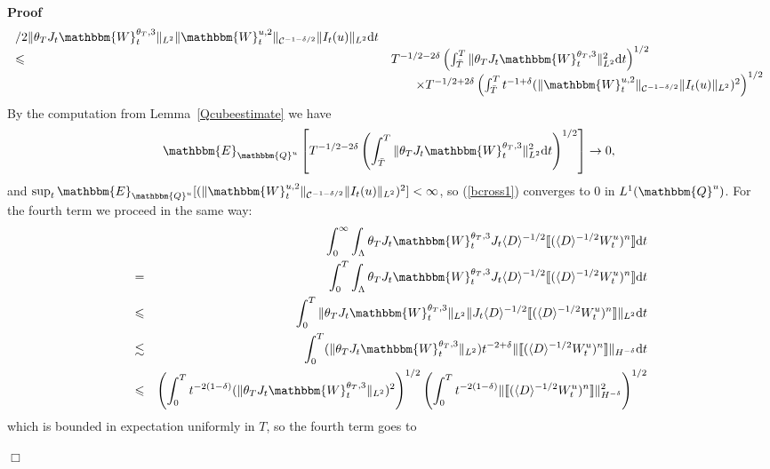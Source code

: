 \documentclass[11pt]{article}
\newcommand{\mathd}{\mathrm{d}}
\newenvironment{proof}{\noindent\textbf{Proof\ }}{\hspace*{\fill}$\Box$\medskip}
\begin{document}
\begin{proof}
\begin{equation}
\begin{array}{ll}
{      / 2} \| \theta_T J_t \mathbbm{W}_t^{\theta_T, 3} \|_{L^2}  \|
      \mathbbm{W}_t^{u, 2} \|_{\mathcal{C}^{- 1 - \delta / 2}} \| I_t (u)
      \|_{L^2} \mathd t\\
      \leqslant & T^{- 1 / 2 - 2 \delta} \left( \int^T_{\bar{T}} \| \theta_T
      J_t \mathbbm{W}_t^{\theta_T, 3} \|^2_{L^2} \mathd t \right)^{1 / 2}\\
      & \qquad \times T^{- 1 / 2 + 2 \delta} \left( \int^T_{\bar{T}} t^{- 1 +
      \delta} (\| \mathbbm{W}_t^{u, 2} \|_{\mathcal{C}^{- 1 - \delta / 2}} \|
      I_t (u) \|_{L^2})^2 \right)^{1 / 2}
    \end{array} \label{bcross1}
  \end{equation}
  By the computation from Lemma~\ref{Qcubeestimate} we have
  \[ \mathbbm{E}_{\mathbbm{Q}^u} \left[ T^{- 1 / 2 - 2 \delta} \left(
     \int^T_{\bar{T}} \| \theta_T J_t \mathbbm{W}_t^{\theta_T, 3} \|^2_{L^2}
     \mathd t \right)^{1 / 2} \right] \rightarrow 0, \]
  and $\sup_t \mathbbm{E}_{\mathbbm{Q}^u} [(\| \mathbbm{W}_t^{u, 2}
  \|_{\mathcal{C}^{- 1 - \delta / 2}} \| I_t (u) \|_{L^2})^2] < \infty$, so
  (\ref{bcross1}) converges to $0$ in $L^1 (\mathbbm{Q}^u)$. For the fourth
  term we proceed in the same way:
  \begin{eqnarray*}
    &  & \int^{\infty}_0 \int_{\Lambda} \theta_T J_t \mathbbm{W}_t^{\theta_T,
    3} J_t \langle D \rangle^{- 1 / 2} \llbracket (\langle D \rangle^{- 1 / 2}
    W^u_t)^n \rrbracket \mathd t\\
    & = & \int^T_0 \int_{\Lambda} \theta_T J_t \mathbbm{W}_t^{\theta_T, 3}
    J_t \langle D \rangle^{- 1 / 2} \llbracket (\langle D \rangle^{- 1 / 2}
    W^u_t)^n \rrbracket \mathd t\\
    & \leqslant & \int^T_0 \| \theta_T J_t \mathbbm{W}_t^{\theta_T, 3}
    \|_{L^2} \| J_t \langle D \rangle^{- 1 / 2} \llbracket (\langle D
    \rangle^{- 1 / 2} W^u_t)^n \rrbracket \|_{L^2} \mathd t\\
    & \lesssim & \int^T_0 (\| \theta_T J_t \mathbbm{W}_t^{\theta_T, 3}
    \|_{L^2}) t^{- 2 + \delta} \| \llbracket (\langle D \rangle^{- 1 / 2}
    W^u_t)^n \rrbracket \|_{H^{- \delta}} \mathd t\\
    & \leqslant & \left( \int^T_0 t^{- 2 (1 - \delta)} (\| \theta_T J_t
    \mathbbm{W}_t^{\theta_T, 3} \|_{L^2})^2 \right)^{1 / 2} \left( \int^T_0
    t^{- 2 (1 - \delta)} \| \llbracket (\langle D \rangle^{- 1 / 2} W^u_t)^n
    \rrbracket \|^2_{H^{- \delta}} \right)^{1 / 2}
  \end{eqnarray*}
  which is bounded in expectation uniformly in $T$, so the fourth term goes to

\end{proof}
\end{document}
